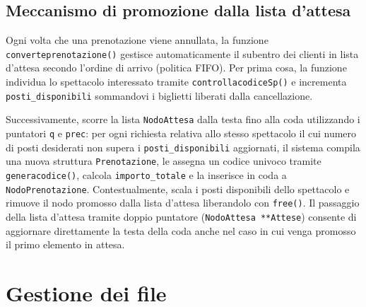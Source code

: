 \documentclass[11pt,a4paper,oneside,openany]{book}
\begin{document}
\subsection{Meccanismo di promozione dalla lista d'attesa}
Ogni volta che una prenotazione viene annullata, la funzione \texttt{converteprenotazione()} gestisce automaticamente il subentro dei clienti in lista d'attesa secondo l'ordine di arrivo (politica FIFO). Per prima cosa, la funzione individua lo spettacolo interessato tramite \texttt{controllacodiceSp()} e incrementa \texttt{posti\_disponibili} sommandovi i biglietti liberati dalla cancellazione.

Successivamente, scorre la lista \texttt{NodoAttesa} dalla testa fino alla coda utilizzando i puntatori \texttt{q} e \texttt{prec}: per ogni richiesta relativa allo stesso spettacolo il cui numero di posti desiderati non supera i \texttt{posti\_disponibili} aggiornati, il sistema compila una nuova struttura \texttt{Prenotazione}, le assegna un codice univoco tramite \texttt{generacodice()}, calcola \texttt{importo\_totale} e la inserisce in coda a \texttt{NodoPrenotazione}. Contestualmente, scala i posti disponibili dello spettacolo e rimuove il nodo promosso dalla lista d'attesa liberandolo con \texttt{free()}. Il passaggio della lista d'attesa tramite doppio puntatore (\texttt{NodoAttesa **Attese}) consente di aggiornare direttamente la testa della coda anche nel caso in cui venga promosso il primo elemento in attesa.

\section{Gestione dei file}
\end{document}
